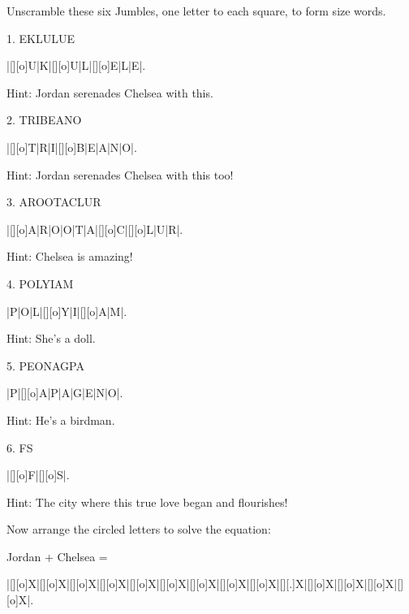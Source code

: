 Unscramble these six Jumbles, one letter to each square, to form size words.

1. EKLULUE
\begin{Puzzle}{7}{1}
|[][o]U|K|[][o]U|L|[][o]E|L|E|.
\end{Puzzle}
Hint: Jordan serenades Chelsea with this.

2. TRIBEANO
\begin{Puzzle}{8}{1}
|[][o]T|R|I|[][o]B|E|A|N|O|.
\end{Puzzle}
Hint: Jordan serenades Chelsea with this too!

3. AROOTACLUR
\begin{Puzzle}{10}{1}
|[][o]A|R|O|O|T|A|[][o]C|[][o]L|U|R|.
\end{Puzzle}
Hint: Chelsea is amazing!

4. POLYIAM
\begin{Puzzle}{7}{1}
|P|O|L|[][o]Y|I|[][o]A|M|.
\end{Puzzle}
Hint: She’s a doll.

5. PEONAGPA
\begin{Puzzle}{8}{1}
|P|[][o]A|P|A|G|E|N|O|.
\end{Puzzle}
Hint: He’s a birdman.

6. FS
\begin{Puzzle}{2}{1}
|[][o]F|[][o]S|.
\end{Puzzle}
Hint: The city where this true love began and flourishes!

Now arrange the circled letters to solve the equation:

Jordan + Chelsea =

\begin{Puzzle}{15}{1}
|[][o]X|[][o]X|[][o]X|[][o]X|[][o]X|[][o]X|[][o]X|[][o]X|[][o]X|[][.]X|[][o]X|[][o]X|[][o]X|[][o]X|.
\end{Puzzle}

